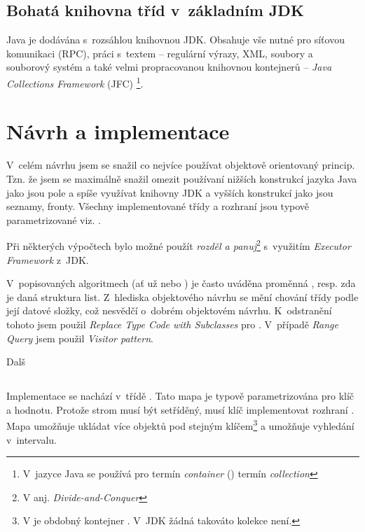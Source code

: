 \subsection{Bohatá knihovna tříd v~základním JDK}

Java je dodávána s~rozsáhlou knihovnou JDK. Obsahuje vše nutné
pro síťovou komunikaci (RPC), práci s~textem -- regulární výrazy,
XML, soubory a souborový
systém a také velmi propracovanou knihovnou kontejnerů -- \emph{Java
Collections Framework }(JFC)
\footnote{V~jazyce Java se používá pro termín \emph{container} (\CC) termín
\emph{collection}}.

\section{Návrh a implementace}
V~celém návrhu jsem se snažil co nejvíce používat objektově orientovaný princip. Tzn. že jsem se maximálně snažil omezit používaní nižších konstrukcí jazyka Java jako jsou pole a spíše využívat knihovny JDK a vyšších konstrukcí jako jsou seznamy, fronty. Všechny implementované třídy a rozhraní jsou typově parametrizované viz. .

Při některých výpočtech bylo možné použít \emph{rozděl a panuj}\cite{Cormen:2001:IA:580470}\footnote{V anj. \emph{Divide-and-Conquer}} s~využitím \emph{Executor Framework} z~JDK.

V~popisovaných algoritmech (ať už \BPTree{} nebo \MIndex) je často uváděna proměnná , resp. zda je daná struktura list. Z~hlediska objektového návrhu se mění chování třídy podle její datové složky, což nesvědčí o~dobrém objektovém návrhu. K~odstranění tohoto jsem použil \emph{Replace Type Code with Subclasses}\cite{fowler1999refactoring} pro \BPTree. V~případě \MIndex{} \emph{Range Query} jsem použil \emph{Visitor pattern}\cite{gamma1995design}.

Dalš
\subsection{\BPTree}
Implementace \BPTree{} se nachází v~třídě \linebreak {}. Tato mapa je typově parametrizována pro klíč a hodnotu. Protože strom musí být setříděný, musí klíč implementovat rozhraní . Mapa umožňuje ukládat více objektů pod stejným klíčem\footnote{V \CC{} je obdobný kontejner \cite{ISO:2012:CPP}. V~JDK žádná takováto kolekce není.} a umožňuje vyhledání v~intervalu.

